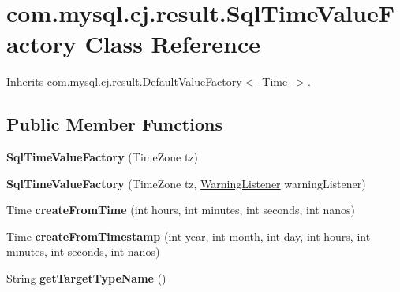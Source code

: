 \hypertarget{classcom_1_1mysql_1_1cj_1_1result_1_1_sql_time_value_factory}{}\section{com.\+mysql.\+cj.\+result.\+Sql\+Time\+Value\+Factory Class Reference}
\label{classcom_1_1mysql_1_1cj_1_1result_1_1_sql_time_value_factory}


Inherits \mbox{\hyperlink{classcom_1_1mysql_1_1cj_1_1result_1_1_default_value_factory}{com.\+mysql.\+cj.\+result.\+Default\+Value\+Factory$<$ Time $>$}}.

\subsection*{Public Member Functions}
\begin{DoxyCompactItemize}
\item 
\mbox{\label{classcom_1_1mysql_1_1cj_1_1result_1_1_sql_time_value_factory_a579f6918213606b00ac7dff75b65bf1d}} 
{\bfseries Sql\+Time\+Value\+Factory} (Time\+Zone tz)
\item 
\mbox{\label{classcom_1_1mysql_1_1cj_1_1result_1_1_sql_time_value_factory_a93d3991aa6d656e64fdd729e6b1435a5}} 
{\bfseries Sql\+Time\+Value\+Factory} (Time\+Zone tz, \mbox{\hyperlink{interfacecom_1_1mysql_1_1cj_1_1_warning_listener}{Warning\+Listener}} warning\+Listener)
\item 
\mbox{\label{classcom_1_1mysql_1_1cj_1_1result_1_1_sql_time_value_factory_aabc4ca0ed309a3a9ec1fe0845fc0c39e}} 
Time {\bfseries create\+From\+Time} (int hours, int minutes, int seconds, int nanos)
\item 
\mbox{\label{classcom_1_1mysql_1_1cj_1_1result_1_1_sql_time_value_factory_a7778ade1a265bbd2f6b8fec881f5a5d0}} 
Time {\bfseries create\+From\+Timestamp} (int year, int month, int day, int hours, int minutes, int seconds, int nanos)
\item 
\mbox{\label{classcom_1_1mysql_1_1cj_1_1result_1_1_sql_time_value_factory_aff24d902b1037965e047b844ded455ca}} 
String {\bfseries get\+Target\+Type\+Name} ()
\end{DoxyCompactItemize}


